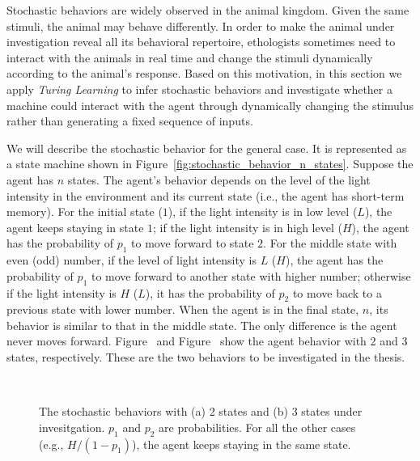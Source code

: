 Stochastic behaviors are widely observed in the animal kingdom. Given the same stimuli, the animal may behave differently. In order to make the animal under investigation reveal all its behavioral repertoire, ethologists sometimes need to interact with the animals in real time and change the stimuli dynamically according to the animal's response. Based on this motivation, in this section we apply \textit{Turing Learning} to infer stochastic behaviors and investigate whether a machine could interact with the agent through dynamically changing the stimulus rather than generating a fixed sequence of inputs.

We will describe the stochastic behavior for the general case. It is represented as a state machine shown in Figure~\ref{fig:stochastic_behavior_n_states}. Suppose the agent has $n$ states. The agent's behavior depends on the level of the light intensity in the environment and its current state (i.e., the agent has short-term memory). For the initial state ($1$), if the light intensity is in low level ($L$), the agent keeps staying in state $1$; if the light intensity is in high level ($H$), the agent has the probability of $p_1$ to move forward to state $2$. For the middle state with even (odd) number, if the level of light intensity is $L$ ($H$), the agent has the probability of $p_1$ to move forward to another state with higher number; otherwise if the light intensity is $H$ ($L$), it has the probability of $p_2$ to move back to a previous state with lower number. When the agent is in the final state, $n$, its behavior is similar to that in the middle state. The only difference is the agent never moves forward. Figure~ and Figure~ show the agent behavior with 2 and 3 states, respectively. These are the two behaviors to be investigated in the thesis. 

\begin{figure}[!t]%
	\centering
		\\
		\caption{The stochastic behaviors with (a) 2 states and (b) 3 states under invesitgation. $p_1$ and $p_2$ are probabilities. For all the other cases (e.g., $H/(1-p_1)$), the agent keeps staying in the same state.\label{fig:stochastic_interaction_case_study}}
\end{figure}

